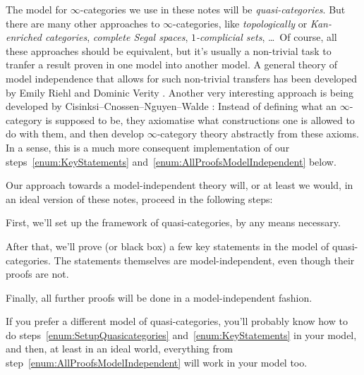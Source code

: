 \documentclass[DIV=12,numbers=enddot,leqno,bibliography=totoc]{scrartcl}
\begin{document}
	\begin{numpar}\label{par:ModelIndependenceIntro}
		The model for $\infty$-categories we use in these notes will be \emph{quasi-categories}. But there are many other approaches to $\infty$-categories, like \emph{topologically} or \emph{Kan-enriched categories}, \emph{complete Segal spaces}, \emph{$1$-complicial sets}, \ldots\ Of course, all these approaches should be equivalent, but it's usually a non-trivial task to tranfer a result proven in one model into another model. A general theory of model independence that allows for such non-trivial transfers has been developed by Emily Riehl and Dominic Verity \cite{RiehlVerity}. Another very interesting approach is being developed by Cisinksi--Cnossen--Nguyen--Walde \cite{FormalizationOfInftyCats}: Instead of defining what an $\infty$-category is supposed to be, they axiomatise what constructions one is allowed to do with them, and then develop $\infty$-category theory abstractly from these axioms. In a sense, this is a much more consequent implementation of our steps~\cref{enum:KeyStatements} and~\cref{enum:AllProofsModelIndependent} below.
		
		Our approach towards a model-independent theory will, or at least we would, in an ideal version of these notes, proceed in the following steps:
		\begin{alphanumerate}
			\item First, we'll set up the framework of quasi-categories, by any means necessary.\label{enum:SetupQuasicategories}
			\item After that, we'll prove (or black box) a few key statements in the model of quasi-categories. The statements themselves are model-independent, even though their proofs are not.\label{enum:KeyStatements}
			\item Finally, all further proofs will be done in a model-independent fashion.\label{enum:AllProofsModelIndependent}
		\end{alphanumerate}
		If you prefer a different model of quasi-categories, you'll probably know how to do steps~\cref{enum:SetupQuasicategories} and~\cref{enum:KeyStatements} in your model, and then, at least in an ideal world, everything from step~\cref{enum:AllProofsModelIndependent} will work in your model too.
		

\end{numpar}
\end{document}

